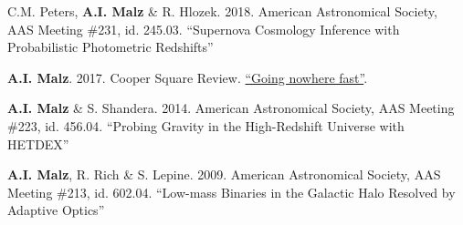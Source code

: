 \begin{list}{}{\malzlist}
	
	\item C.M. Peters, {\bf A.I. Malz} \& R. Hlozek. 2018. American Astronomical Society, AAS Meeting \#231, id. 245.03. ``Supernova Cosmology Inference with Probabilistic Photometric Redshifts''

	\item {\bf A.I. Malz}. 2017. Cooper Square Review. \href{http://coopersquarereview.org/post/going-nowhere-fast/}{``Going nowhere fast''}.
	
	\item {\bf A.I. Malz} \& S. Shandera. 2014. American Astronomical Society, AAS Meeting \#223, id. 456.04. ``Probing Gravity in the High-Redshift Universe with HETDEX''
	
	\item {\bf A.I. Malz}, R. Rich \& S. Lepine. 2009. American Astronomical Society, AAS Meeting \#213, id. 602.04. ``Low-mass Binaries in the Galactic Halo Resolved by Adaptive Optics''
\end{list}
